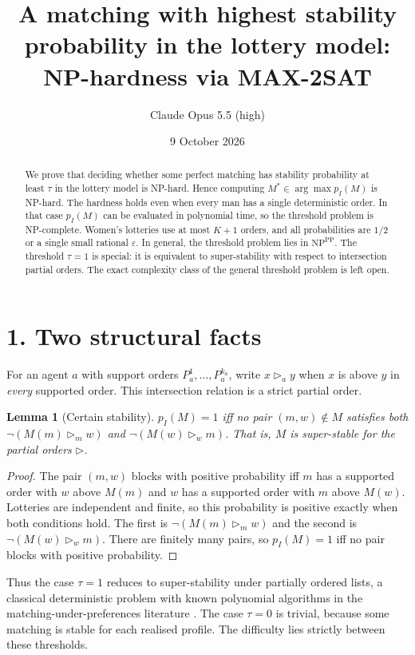\documentclass[11pt]{article}
\title{A matching with highest stability probability in the lottery model: NP-hardness via MAX-2SAT}
\author{Claude Opus 5.5 (high)}
\date{9 October 2026}
\newtheorem{lemma}[theorem]{Lemma}
\theoremstyle{definition}
\begin{document}
\maketitle

\begin{abstract}
We prove that deciding whether some perfect matching has stability probability at least $\tau$
in the lottery model is NP-hard. Hence computing $M^*\in\arg\max p_I(M)$ is NP-hard. The hardness holds
even when every man has a single deterministic order. In that case $p_I(M)$ can be evaluated in polynomial time,
so the threshold problem is NP-complete. Women's lotteries use at most $K+1$ orders, and all probabilities are
$1/2$ or a single small rational $\varepsilon$. In general, the threshold problem lies in
$\mathrm{NP}^{\mathrm{PP}}$. The threshold $\tau=1$ is special: it is equivalent to super-stability with respect to
intersection partial orders. The exact complexity class of the general threshold problem is left open.
\end{abstract}

\section*{1. Two structural facts}
For an agent $a$ with support orders $P_a^1,\dots,P_a^{k_a}$, write
$x\rhd_a y$ when $x$ is above $y$ in \emph{every} supported order. This intersection relation is a strict partial order.

\begin{lemma}[Certain stability]\label{lem:cert}
$p_I(M)=1$ iff no pair $(m,w)\notin M$ satisfies both
$\neg(M(m)\rhd_m w)$ and $\neg(M(w)\rhd_w m)$. That is, $M$ is super-stable for the partial orders $\rhd$.
\end{lemma}
\begin{proof}
The pair $(m,w)$ blocks with positive probability iff $m$ has a supported order with $w$ above $M(m)$ and
$w$ has a supported order with $m$ above $M(w)$. Lotteries are independent and finite, so this probability is positive
exactly when both conditions hold. The first is $\neg(M(m)\rhd_m w)$ and the second is $\neg(M(w)\rhd_w m)$.
There are finitely many pairs, so $p_I(M)=1$ iff no pair blocks with positive probability.
\end{proof}
Thus the case $\tau=1$ reduces to super-stability under partially ordered lists, a classical
deterministic problem with known polynomial algorithms in the matching-under-preferences literature
\cite{irving94,manlove}. The case $\tau=0$ is trivial, because some matching is stable for each realised profile.
The difficulty lies strictly between these thresholds.
\end{document}
